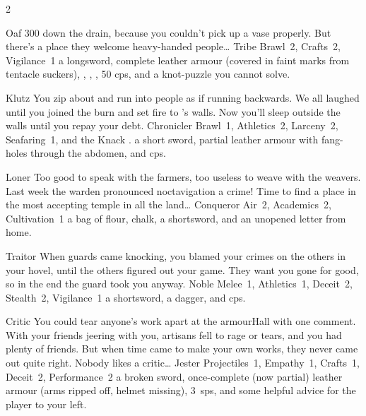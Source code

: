 \begin{multicols}{2}
\nobreak
\begin{itemize}

    {Oaf}%
    {300  down the drain, because you couldn't pick up a vase properly.
      But there's a place they welcome heavy-handed people\ldots
    }%
    {Tribe}%
    {Brawl~2, Crafts~2, Vigilance~1}%
    {a longsword, complete leather armour (covered in faint marks from tentacle suckers), \rations, \rations, \rations, 50 \glspl{cp}, and a knot-puzzle you cannot solve.}%

    {Klutz}%
    {You zip about and run into people as if running backwards.
      We all laughed until you joined the \gls{burn} and set fire to 's walls.
      Now you'll sleep outside the walls until you repay your debt.}%
    {Chronicler}%
    {Brawl~1, Athletics~2, Larceny~2, Seafaring~1, and the Knack \charge.}%
    {a short sword, partial leather armour with fang-holes through the abdomen, and  \glspl{cp}.}%

    {Loner}%
    {Too good to speak with the farmers, too useless to weave with the weavers.
      Last week the \gls{warden} pronounced noctavigation a crime!
      Time to find a place in the most accepting \gls{temple} in all the land\ldots}%
    {Conqueror}%
    {
      Air~2, Academics~2, Cultivation~1
    }%
    {a bag of flour, chalk, a shortsword, and an unopened letter from home.}%

    {Traitor}%
    {
      When guards came knocking, you blamed your crimes on the others in your hovel, until the others figured out your game.
      They want you gone for good, so in the end the \gls{guard} took you anyway.
    }%
    {Noble}%
    {
      Melee~1, Athletics~1, Deceit~2, Stealth~2, Vigilance~1
    }%
    {a shortsword, a dagger, and  \glspl{cp}.}%

    {Critic}%
    {
      You could tear anyone's work apart at the \gls{armourHall} with one comment.
      With your friends jeering with you, artisans fell to rage or tears, and you had plenty of friends.
      But when time came to make your own works, they never came out quite right.
      Nobody likes a critic\ldots
    }%
    {Jester}%
    {
      Projectiles~1, Empathy~1, Crafts~1, Deceit~2, Performance~2
    }%
    {a broken sword, once-complete (now partial) leather armour (arms ripped off, helmet missing), 3~\glspl{sp}, and some helpful advice for the player to your left.}%


\end{itemize}
\end{multicols}
